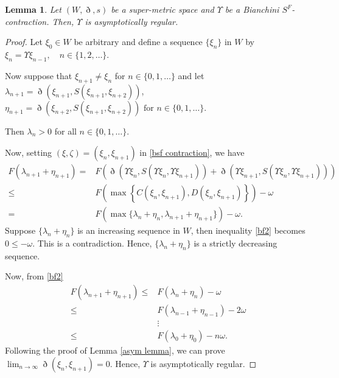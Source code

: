 \documentclass[pdflatex,sn-mathphys-num]{sn-jnl}%
\theoremstyle{thmstyleone}%
\newtheorem{lemma}[theorem]{Lemma}
\theoremstyle{thmstyletwo}%
\theoremstyle{thmstylethree}%
\begin{document}
\begin{lemma}\label{asym lemma2}
    Let $(W,\eth,s)$ be a super-metric space and $\Upsilon $ be a \textit{Bianchini $S^F$-contraction}. Then, $\Upsilon $ is asymptotically regular.
\end{lemma}
\begin{proof}
    Let $\xi_0 \in W$ be arbitrary and define a sequence $\{\xi_n\}$ in $W$ by $\xi_n = \Upsilon \xi_{n-1}, \quad n \in \{1,2,\ldots\}$.

Now suppose that $\xi_{n+1} \neq \xi_n$ for $n \in \{0,1,\ldots\}$ and let $\lambda_{n+1} = \eth(\xi_{n+1}, S(\xi_{n+1}, \xi_{n+2}))$, $ \eta_{n+1} = \eth(\xi_{n+2}, S(\xi_{n+1}, \xi_{n+2})) \text{ for } n \in \{0,1,\ldots\}$.

Then $\lambda_n > 0$ for all $n \in \{0,1,\ldots\}$.

Now, setting $(\xi ,\zeta)=(\xi_n,\xi_{n+1})$ in \eqref{bsf contraction}, we have
\begin{equation}\label{bf2}
\begin{split}
    F(\lambda_{n+1}+\eta_{n+1})=&F(\eth(\Upsilon \xi_{n},S(\Upsilon \xi_{n},\Upsilon \xi _{n+1}))+\eth(\Upsilon \xi_{n+1},S(\Upsilon \xi_{n},\Upsilon \xi_{n+1})))\\
    \le& F(\max \left\{C(\xi_n,\xi_{n+1}), D(\xi_n,\xi_{n+1})\right\})-\omega  \\
    =& F(\max\{\lambda_{n}+\eta_{n}, \lambda_{n+1}+\eta_{n+1}\})-\omega  .
    \end{split}
\end{equation}
Suppose $\{\lambda_{n}+\eta_{n}\}$ is an increasing sequence in $W$, then inequality \eqref{bf2} becomes $0\le-\omega  $. This is a contradiction. Hence, $\{\lambda_{n}+\eta_{n}\}$ is a strictly decreasing sequence.

Now, from \eqref{bf2} \begin{equation}
    \begin{split}
        F(\lambda_{n+1}+\eta_{n+1})\le& F(\lambda_{n}+\eta_{n})-\omega  \\
        \le& F(\lambda_{n-1}+\eta_{n-1})-2\omega  \\
    &\vdots\\
    \le& F(\lambda_{0}+\eta_{0})-n\omega  .
    \end{split}
\end{equation}
Following the proof of Lemma \ref{asym lemma}, we can prove $\lim_{n \to \infty}\eth(\xi_n,\xi_{n+1})=0$. Hence, $\Upsilon $ is asymptotically regular.
\end{proof}
\end{document}
